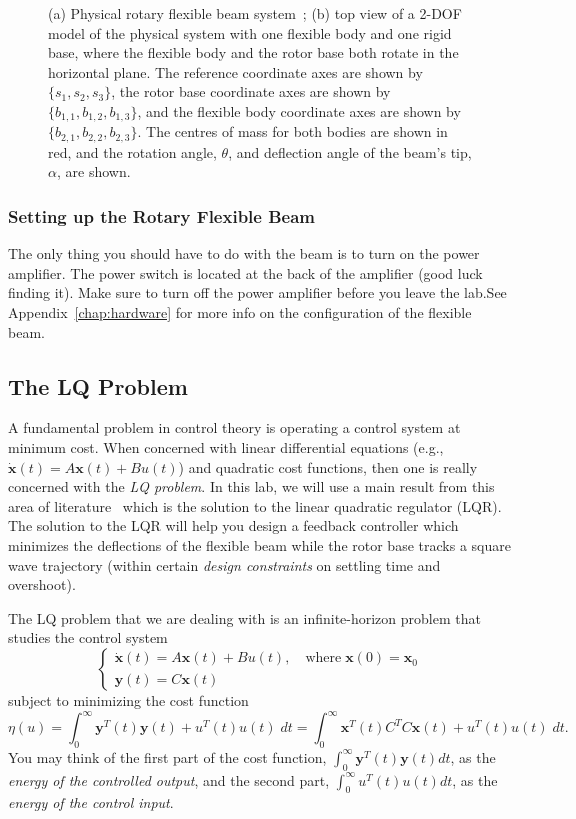 \begin{figure}[htb!]
\begin{subfigure}{,4\textwidth}
        \caption{}
    \end{subfigure}
    \caption{(a) Physical rotary flexible beam system~\cite{Q-Flex-Beam}; (b) top view of a 2-DOF model of the physical system with one flexible body and one rigid base, where the flexible body and the rotor base both rotate in the horizontal plane. The reference coordinate axes are shown by $\{s_1,s_2,s_3\}$, the rotor base coordinate axes are shown by $\{b_{1,1},b_{1,2}, b_{1,3}\}$, and the flexible body coordinate axes are shown by $\{b_{2,1},b_{2,2},b_{2,3}\}$. The centres of mass for both bodies are shown in red, and the rotation angle, $\theta$, and deflection angle of the beam's tip, $\alpha$, are shown.}
    \label{fig:lab1_rotary_flexible_beam}
\end{figure}

\subsubsection{Setting up the Rotary Flexible Beam}\label{sub subsection:lab1_setup}
The only thing you should have to do with the beam is to turn on the power amplifier. The power switch is located at the back of the amplifier (good luck finding it). Make sure to turn off the power amplifier before you leave the lab.See Appendix~\ref{chap:hardware} for more info on the configuration of the flexible beam.

\subsection{The LQ Problem}
A fundamental problem in control theory is operating a control system at minimum cost. When concerned with linear differential equations (e.g., $\mathbf{\dot{x}}(t) = A\mathbf{x}(t) + Bu(t)$) and quadratic cost functions, then one is really concerned with the \emph{LQ problem}. In this lab, we will use a main result from this area of literature~\cite{kwakernaak1972linear} which is the solution to the linear quadratic regulator (LQR). The solution to the LQR will help you design a feedback controller which minimizes the deflections of the flexible beam while the rotor base tracks a square wave trajectory (within certain \emph{design constraints} on settling time and overshoot).

The LQ problem that we are dealing with is an infinite-horizon problem that studies the control system
\[
    \begin{cases}
        \dot{\mathbf{x}}(t) = A\mathbf{x}(t)+Bu(t), \quad \text{where} \; \mathbf{x}(0) = \mathbf{x}_0 \\
        \mathbf{y}(t) = C \mathbf{x}(t)
    \end{cases}
\]
subject to minimizing the cost function
\[
    \eta(u) = \int_0^{\infty} \mathbf{y}^T(t)\mathbf{y}(t) + u^T(t)u(t) \; dt = \int_0^\infty  \mathbf{x}^T(t) C^T C \mathbf{x}(t) + u^T(t)u(t) \; dt.
\]
You may think of the first part of the cost function, $ \int_0^{\infty} \mathbf{y}^T(t)\mathbf{y}(t) dt$, as the \emph{energy of the controlled output}, and the second part, $\int_0^{\infty} u^T(t)u(t) dt$, as the \emph{energy of the control input}.

